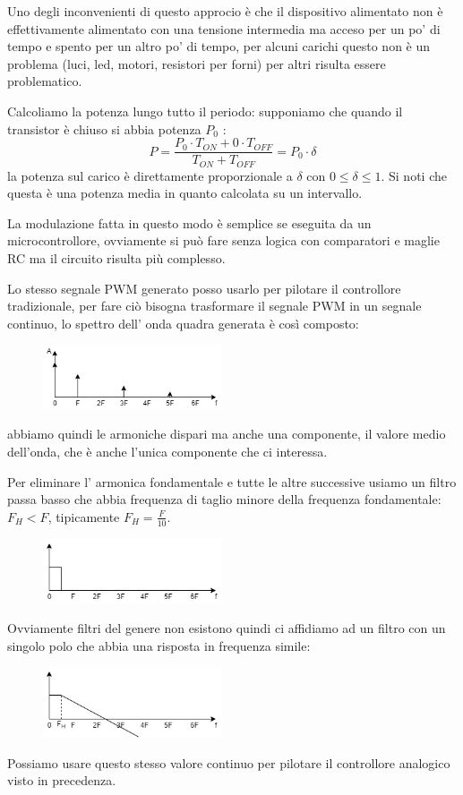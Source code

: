 Uno degli inconvenienti di questo approcio è che il dispositivo alimentato non è effettivamente alimentato con una tensione intermedia ma acceso per un po' di tempo e spento per un altro po' di tempo, per alcuni carichi questo non è un problema (luci, led, motori, resistori per forni) per altri risulta essere problematico.

Calcoliamo la potenza lungo tutto il periodo: supponiamo che quando il transistor è chiuso si abbia potenza $P_0$ : 
$$ P = \frac{P_0 \cdot T_{ON} + 0 \cdot T_{OFF}}{T_{ON} + T_{OFF}} = P_0 \cdot \delta $$
la potenza sul carico è direttamente proporzionale a $\delta$ con $0 \leq \delta \leq 1$.
Si noti che questa è una potenza media in quanto calcolata su un intervallo.

La modulazione fatta in questo modo è semplice se eseguita da un microcontrollore, ovviamente si può fare senza logica con comparatori e maglie RC ma il circuito risulta più complesso.

Lo stesso segnale PWM generato posso usarlo per pilotare il controllore tradizionale, per fare ciò bisogna trasformare il segnale PWM in un segnale continuo, lo spettro dell' onda quadra generata è così composto:
\begin{figure}[H]
    \centering
    \includegraphics[width=200px]{images/19_PWM/pwm_spectre.png}
\end{figure}
abbiamo quindi le armoniche dispari ma anche una componente, il valore medio dell'onda, che è anche l'unica componente che ci interessa.

Per eliminare l' armonica fondamentale e tutte le altre successive usiamo un filtro passa basso che abbia frequenza di taglio minore della frequenza fondamentale: $F_H < F$, tipicamente $F_H = \frac{F}{10}$.
\begin{figure}[H]
    \centering
    \includegraphics[width=200px]{images/19_PWM/ideal_filter.png}
\end{figure}
Ovviamente filtri del genere non esistono quindi ci affidiamo ad un filtro con un singolo polo che abbia una risposta in frequenza simile:
\begin{figure}[H]
    \centering
    \includegraphics[width=200px]{images/19_PWM/actual_filter.png}
\end{figure}
Possiamo usare questo stesso valore continuo per pilotare il controllore analogico visto in precedenza.

